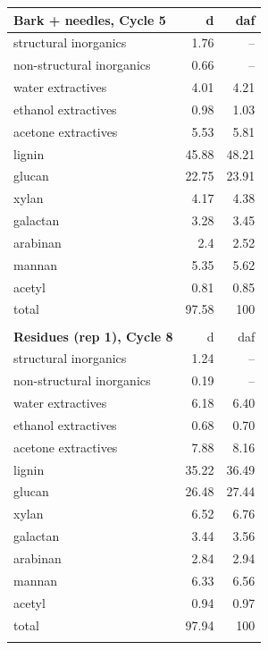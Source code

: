 \documentclass[12pt,titlepage]{article}
\begin{document}
\begin{longtable}{lrr}
    \textbf{Bark + needles, Cycle 5} & d & daf \\
    \midrule
    structural inorganics     & 1.76  & -- \\
    non-structural inorganics & 0.66  & -- \\
    water extractives         & 4.01  & 4.21 \\
    ethanol extractives       & 0.98  & 1.03 \\
    acetone extractives       & 5.53  & 5.81 \\
    lignin                    & 45.88 & 48.21 \\
    glucan                    & 22.75 & 23.91 \\
    xylan                     & 4.17  & 4.38 \\
    galactan                  & 3.28  & 3.45 \\
    arabinan                  & 2.4   & 2.52 \\
    mannan                    & 5.35  & 5.62 \\
    acetyl                    & 0.81  & 0.85 \\
    total                     & 97.58 & 100 \\
    \\

    \textbf{Residues (rep 1), Cycle 8} & d & daf \\
    \midrule
    structural inorganics     & 1.24  & -- \\
    non-structural inorganics & 0.19  & -- \\
    water extractives         & 6.18  & 6.40 \\
    ethanol extractives       & 0.68  & 0.70 \\
    acetone extractives       & 7.88  & 8.16 \\
    lignin                    & 35.22 & 36.49 \\
    glucan                    & 26.48 & 27.44 \\
    xylan                     & 6.52  & 6.76 \\
    galactan                  & 3.44  & 3.56 \\
    arabinan                  & 2.84  & 2.94 \\
    mannan                    & 6.33  & 6.56 \\
    acetyl                    & 0.94  & 0.97 \\
    total                     & 97.94 & 100 \\
    \\


\end{longtable}
\end{document}

